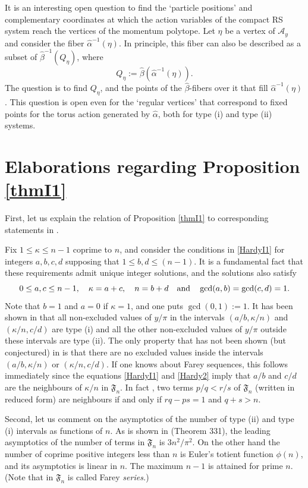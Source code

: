 \documentclass[a4paper,11pt,reqno]{amsart}
\theoremstyle{definition}
\numberwithin{equation}{section}
\newcommand{\be}{\begin{equation}}
\newcommand{\ee}{\end{equation}}
\def\cA{{\mathcal A}}                       %
\def\fF{{\mathfrak F}}                      %
\begin{document}
It is an interesting open question to find the `particle positions' and complementary coordinates
at which the action variables of the compact RS system reach the vertices
of the momentum polytope.
Let $\eta$ be a vertex of $\cA_y$ and consider the fiber $\hat \alpha^{-1}(\eta)$.
In principle, this fiber can also be described as a subset of $\hat \beta^{-1}(Q_\eta)$,
where
\be
Q_\eta:= \hat \beta(\hat \alpha^{-1}(\eta)).
\label{A8}\ee
The question is to find $Q_\eta$, and the points of the $\hat \beta$-fibers over it that fill
$\hat \alpha^{-1}(\eta)$.
This question is open even for the `regular vertices' that correspond to fixed points for the torus action generated
by $\hat \alpha$, both for type (i) and type (ii) systems.

\section{Elaborations regarding Proposition \ref{thmI1}}\label{newAppB}

First,  let us explain the relation of Proposition \ref{thmI1} to  corresponding statements in \cite{FK}.

Fix $1 \leq \kappa \leq n-1$ coprime to $n$, and consider the conditions in \eqref{HardyI1}
for  integers $a,b,c,d$ supposing that
 $1 \leq b,d \leq (n-1)$.
It is a fundamental fact \cite{HW} that these requirements admit unique integer solutions, and the solutions also satisfy
\be
0 \leq  a,c \leq n-1, \quad  \kappa=a + c, \quad n = b+d \quad \hbox{and} \quad \gcd(a,b) = \gcd(c,d)=1.
\label{Hardy2}\ee
Note that $b=1$ and $a=0$ if $\kappa =1$, and one puts $\gcd(0,1):=1$.
It has been shown in \cite{FK} that all non-excluded values of $y/\pi$ in the intervals $(a/b, \kappa/n)$ and $(\kappa/n, c/d)$ are type (i)
and all the other non-excluded values of $y/\pi$ outside these intervals are type (ii).
The only property that has not been shown  (but conjectured) in \cite{FK} is that there are no excluded values inside
the intervals $(a/b, \kappa/n)$ or $(\kappa/n, c/d)$.
 If one knows about Farey sequences,
 this follows immediately since the equations \eqref{HardyI1} and \eqref{Hardy2} imply  that
$a/b$ and $c/d$ are the neighbours of $\kappa/n$ in $\fF_n$.
In fact \cite{HW,R}, two terms $p/q < r/s$ of $\fF_n$ (written in reduced form) are neighbours if and only if
$rq-ps=1$ and $q+s > n$.


Second, let us comment on the asymptotics of the number of type (ii) and type (i) intervals as functions of $n$.
  As is shown in \cite{HW} (Theorem 331), the leading
  asymptotics of the number of terms in $\fF_n$ is $3 n^2/\pi^2$.
   On the other hand the number of coprime  positive integers less than $n$ is Euler's totient function $\phi(n)$, and its asymptotics
   is linear in $n$. The maximum $n-1$ is attained for prime $n$.
(Note that in \cite{HW} $\fF_n$ is called Farey \emph{series.})
\end{document}
